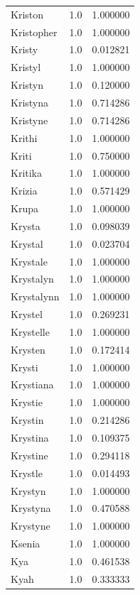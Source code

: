 \documentclass[
  letterpaper,
  DIV=11,
  numbers=noendperiod]{scrreprt}
\begin{document}
\begin{tabular}{lrr}
Kriston         &   1.0 &   1.000000 \\
Kristopher      &   1.0 &   1.000000 \\
Kristy          &   1.0 &   0.012821 \\
Kristyl         &   1.0 &   1.000000 \\
Kristyn         &   1.0 &   0.120000 \\
Kristyna        &   1.0 &   0.714286 \\
Kristyne        &   1.0 &   0.714286 \\
Krithi          &   1.0 &   1.000000 \\
Kriti           &   1.0 &   0.750000 \\
Kritika         &   1.0 &   1.000000 \\
Krizia          &   1.0 &   0.571429 \\
Krupa           &   1.0 &   1.000000 \\
Krysta          &   1.0 &   0.098039 \\
Krystal         &   1.0 &   0.023704 \\
Krystale        &   1.0 &   1.000000 \\
Krystalyn       &   1.0 &   1.000000 \\
Krystalynn      &   1.0 &   1.000000 \\
Krystel         &   1.0 &   0.269231 \\
Krystelle       &   1.0 &   1.000000 \\
Krysten         &   1.0 &   0.172414 \\
Krysti          &   1.0 &   1.000000 \\
Krystiana       &   1.0 &   1.000000 \\
Krystie         &   1.0 &   1.000000 \\
Krystin         &   1.0 &   0.214286 \\
Krystina        &   1.0 &   0.109375 \\
Krystine        &   1.0 &   0.294118 \\
Krystle         &   1.0 &   0.014493 \\
Krystyn         &   1.0 &   1.000000 \\
Krystyna        &   1.0 &   0.470588 \\
Krystyne        &   1.0 &   1.000000 \\
Ksenia          &   1.0 &   1.000000 \\
Kya             &   1.0 &   0.461538 \\
Kyah            &   1.0 &   0.333333 \\

\end{tabular}
\end{document}
